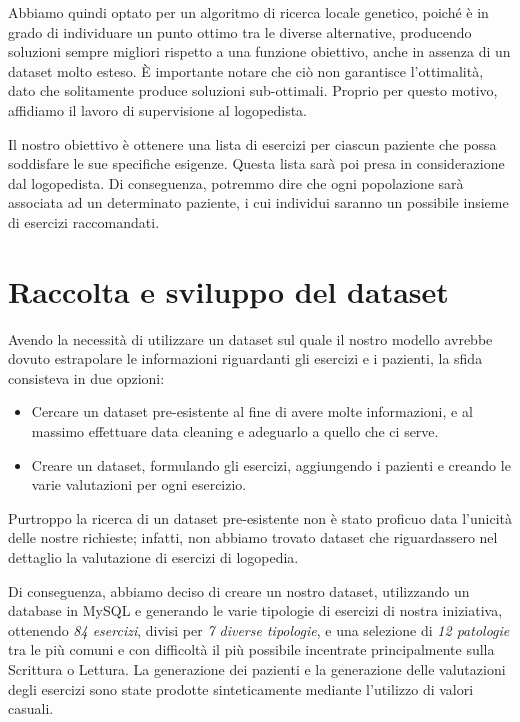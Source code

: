 \documentclass{article}
\begin{document}
    Abbiamo quindi optato per un algoritmo di ricerca locale genetico, poiché è in grado di individuare un punto ottimo tra le diverse alternative, producendo
    soluzioni sempre migliori rispetto a una funzione obiettivo, anche in assenza di un dataset molto esteso. È importante notare che ciò non garantisce l'ottimalità,
    dato che solitamente produce soluzioni sub-ottimali. Proprio per questo motivo, affidiamo il lavoro di supervisione al logopedista.

    Il nostro obiettivo è ottenere una lista di esercizi per ciascun paziente che possa soddisfare le sue specifiche esigenze. Questa lista sarà poi presa in
    considerazione dal logopedista. Di conseguenza, potremmo dire che ogni popolazione sarà associata ad un determinato
    paziente, i cui individui saranno un possibile insieme di esercizi raccomandati.

    \section{Raccolta e sviluppo del dataset}

    Avendo la necessità di utilizzare un dataset sul quale il nostro modello avrebbe dovuto estrapolare le informazioni riguardanti gli esercizi e i pazienti, la sfida consisteva in due opzioni:

    \begin{itemize}
        \item Cercare un dataset pre-esistente al fine di avere molte informazioni, e al massimo effettuare data cleaning e adeguarlo a quello che ci serve.
        \item Creare un dataset, formulando gli esercizi, aggiungendo i pazienti e creando le varie valutazioni per ogni esercizio.
    \end{itemize}

    Purtroppo la ricerca di un dataset pre-esistente non è stato proficuo data l'unicità delle nostre richieste; infatti, non abbiamo trovato dataset che riguardassero nel dettaglio la valutazione di esercizi di logopedia.

    Di conseguenza, abbiamo deciso di creare un nostro dataset, utilizzando un database in MySQL e generando le varie tipologie di esercizi di nostra iniziativa, ottenendo \textit{84 esercizi}, divisi per \textit{7 diverse tipologie}, e una selezione di \textit{12 patologie} tra le più comuni e con difficoltà il più possibile incentrate principalmente sulla Scrittura o Lettura. La generazione dei pazienti e la generazione delle valutazioni degli esercizi sono state prodotte sinteticamente mediante l'utilizzo di valori casuali.
\end{document}
